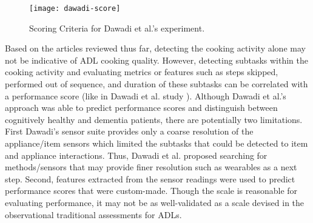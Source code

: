 \begin{figure}[ht]
    \centering
    \texttt{[image: dawadi-score]}
    \caption{Scoring Criteria for Dawadi et al.'s experiment.}
    \label{fig:dawadi-score}
\end{figure}

Based on the articles reviewed thus far, detecting the cooking activity alone may not be indicative of ADL cooking quality. However, detecting subtasks within the cooking activity and evaluating metrics or features such as steps skipped, performed out of sequence, and duration of these subtasks can be correlated with a performance score (like in Dawadi et al. study \cite{dawadi_automated_2013}). Although Dawadi et al.'s approach was able to predict performance scores and distinguish between cognitively healthy and dementia patients, there are potentially two limitations. First Dawadi's sensor suite provides only a coarse resolution of the appliance/item sensors which limited the subtasks that could be detected to item and appliance interactions. Thus, Dawadi et al. proposed searching for methods/sensors that may provide finer resolution such as wearables \cite{dawadi_automated_2013} as a next step. Second, features extracted from the sensor readings were used to predict performance scores that were custom-made. Though the scale is reasonable for evaluating performance, it may not be as well-validated as a scale devised in the observational traditional assessments for ADLs.  

